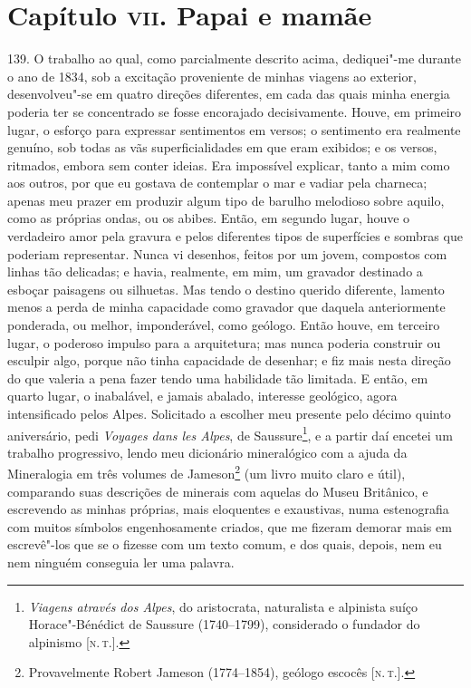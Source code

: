\chapter{Capítulo \textsc{vii}. Papai e mamãe}

139. O trabalho ao qual, como parcialmente descrito acima, dediquei"-me
durante o ano de 1834, sob a excitação proveniente de minhas viagens ao
exterior, desenvolveu"-se em quatro direções diferentes, em cada das
quais minha energia poderia ter se concentrado se fosse encorajado
decisivamente. Houve, em primeiro lugar, o esforço para expressar
sentimentos em versos; o sentimento era realmente genuíno, sob todas as
vãs superficialidades em que eram exibidos; e os versos, ritmados,
embora sem conter ideias. Era impossível explicar, tanto a mim como aos
outros, por que eu gostava de contemplar o mar e vadiar pela charneca;
apenas meu prazer em produzir algum tipo de barulho melodioso sobre
aquilo, como as próprias ondas, ou os abibes. Então, em segundo lugar,
houve o verdadeiro amor pela gravura e pelos diferentes tipos de
superfícies e sombras que poderiam representar. Nunca vi desenhos,
feitos por um jovem, compostos com linhas tão delicadas; e havia,
realmente, em mim, um gravador destinado a esboçar paisagens ou
silhuetas. Mas tendo o destino querido diferente, lamento menos a perda
de minha capacidade como gravador que daquela anteriormente ponderada,
ou melhor, imponderável, como geólogo. Então houve, em terceiro lugar, o
poderoso impulso para a arquitetura; mas nunca poderia construir ou
esculpir algo, porque não tinha capacidade de desenhar; e fiz mais nesta
direção do que valeria a pena fazer tendo uma habilidade tão limitada. E
então, em quarto lugar, o inabalável, e jamais abalado, interesse
geológico, agora intensificado pelos Alpes. Solicitado a escolher meu
presente pelo décimo quinto aniversário, pedi \emph{Voyages dans les
Alpes}, de Saussure\footnote{\emph{Viagens através dos Alpes}, do
  aristocrata, naturalista e alpinista suíço Horace"-Bénédict de Saussure
  (1740--1799), considerado o fundador do alpinismo {[}\textsc{n.\,t.}{]}.}, e a
partir daí encetei um trabalho progressivo, lendo meu dicionário
mineralógico com a ajuda da Mineralogia em três volumes de
Jameson\footnote{Provavelmente Robert Jameson (1774--1854), geólogo
  escocês {[}\textsc{n.\,t.}{]}.} (um livro muito claro e útil), comparando
suas descrições de minerais com aquelas do Museu Britânico, e escrevendo
as minhas próprias, mais eloquentes e exaustivas, numa estenografia com
muitos símbolos engenhosamente criados, que me fizeram demorar mais em
escrevê"-los que se o fizesse com um texto comum, e dos quais, depois,
nem eu nem ninguém conseguia ler uma palavra.

